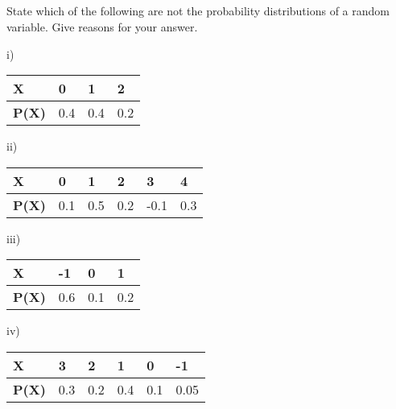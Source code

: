 \documentclass[journal,12pt,twocolumn]{IEEEtran}
\begin{document}
\subsection*{}
\begin{flushleft} State which of the following are not the
probability distributions of a random variable.
Give reasons for your answer.\end{flushleft}
\newline i)
\begin{table}[ht]
\begin{tabular}{|l|l|l|l|}
\hline
\textbf{X}    & 0   & 1   & 2   \\ \hline
\textbf{P(X)} & 0.4 & 0.4 & 0.2 \\ \hline
\end{tabular}
\end{table}
\newline ii)
\begin{table}[ht]
\begin{tabular}{|l|l|l|l|l|l|}
\hline
\textbf{X}    & 0   & 1   & 2   & 3    & 4   \\ \hline
\textbf{P(X)} & 0.1 & 0.5 & 0.2 & -0.1 & 0.3 \\ \hline
\end{tabular}
\end{table}
\newline iii)
\begin{table}[ht]
\begin{tabular}{|l|l|l|l|}
\hline
\textbf{X}    & -1   & 0   & 1   \\ \hline
\textbf{P(X)} & 0.6 & 0.1 & 0.2 \\ \hline
\end{tabular}
\end{table}
\newline iv)
\begin{table}[ht]
\begin{tabular}{|l|l|l|l|l|l|}
\hline
\textbf{X}    & 3   & 2   & 1   & 0    & -1   \\ \hline
\textbf{P(X)} & 0.3 & 0.2 & 0.4 & 0.1 & 0.05 \\ \hline
\end{tabular}
\end{table}
\end{document}
